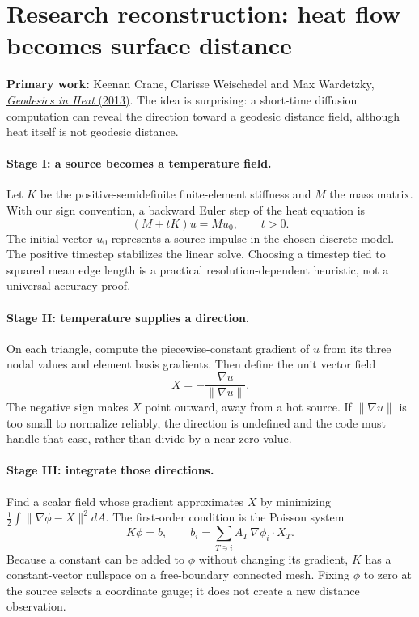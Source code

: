 \clearpage
\section*{Research reconstruction: heat flow becomes surface distance}
\noindent\textbf{Primary work:} Keenan Crane, Clarisse Weischedel and
Max Wardetzky,
\href{https://www.cs.cmu.edu/~kmcrane/Projects/HeatMethod/}
{\emph{Geodesics in Heat} (2013)}. The idea is surprising:
a short-time diffusion computation can reveal the direction
toward a geodesic distance field, although heat itself is not
geodesic distance.

\paragraph{Stage I: a source becomes a temperature field.}
Let \(K\) be the positive-semidefinite finite-element stiffness
and \(M\) the mass matrix. With our sign convention, a backward
Euler step of the heat equation is
\[
(M+tK)u=M u_0,\qquad t>0.
\]
The initial vector \(u_0\) represents a source impulse in the
chosen discrete model. The positive timestep stabilizes the
linear solve. Choosing a timestep tied to squared mean edge
length is a practical resolution-dependent heuristic, not a
universal accuracy proof.

\paragraph{Stage II: temperature supplies a direction.}
On each triangle, compute the piecewise-constant gradient of
\(u\) from its three nodal values and element basis gradients.
Then define the unit vector field
\[
X=-\frac{\nabla u}{\lVert\nabla u\rVert}.
\]
The negative sign makes \(X\) point outward, away from a hot
source. If \(\lVert\nabla u\rVert\) is too small to normalize
reliably, the direction is undefined and the code must handle
that case, rather than divide by a near-zero value.

\paragraph{Stage III: integrate those directions.}
Find a scalar field whose gradient approximates \(X\) by
minimizing \(\frac12\int\lVert\nabla\phi-X\rVert^2dA\).
The first-order condition is the Poisson system
\[
K\phi=b,\qquad
b_i=\sum_{T\ni i}A_T\,\nabla\phi_i\cdot X_T.
\]
Because a constant can be added to \(\phi\) without changing
its gradient, \(K\) has a constant-vector nullspace on a
free-boundary connected mesh. Fixing \(\phi\) to zero at the
source selects a coordinate gauge; it does not create a new
distance observation.

